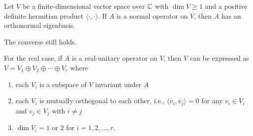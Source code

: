     \begin{theoremenv}
        Let $V$ be a finite-dimensional vector space over $\mathbb{C}$ with $\dim V\ge 1$ and a positive definite hermitian product $\langle \cdot, \cdot \rangle$. If $A$ is a normal operator on $V$, then $A$ has an orthonormal eigenbasis.
    \end{theoremenv}
    \begin{remarkenv}
        The converse still holds.
    \end{remarkenv}
    \begin{theoremenv}
        For the real case, if $A$ is a real-unitary operator on $V$, then $V$ can be expressed as $V=V_1 \oplus V_2 \oplus \cdots \oplus V_r$ where
        \begin{enumerate}
            \item each $V_i$ is a subspace of $V$ invariant under $A$
            \item each $V_i$ is mutually orthogonal to each other, i.e., $\langle v_i, v_j \rangle = 0$ for any $v_i \in V_i$ and $v_j \in V_j$ with $i\neq j$
            \item $\dim V_i = 1$ or $2$ for $i=1,2,\ldots,r$.
        \end{enumerate}
    \end{theoremenv}
